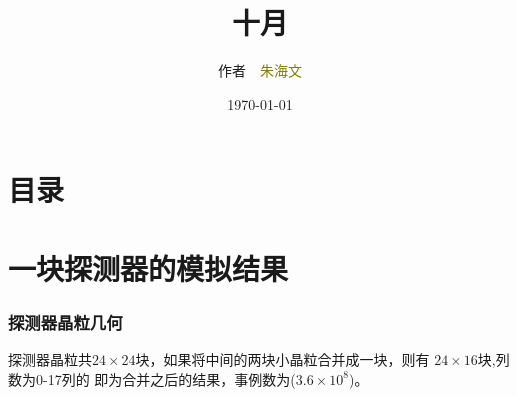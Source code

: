 \documentclass{beamer}
\begin{document}
\begin{CJK*}{UTF8}{gkai}
  \title{十月}
  \author[\textcolor{black}{作者 朱海文}]{作者~~\textcolor{olive}{朱海文}}
  \institute{\textcolor{violet}{摩科特医疗器械有限公司}}
  \date{\today}
  \frame{\titlepage}
  \section*{目录}
  \section{一块探测器的模拟结果}
  \begin{frame}\frametitle{探测器晶粒几何}
    \begin{minipage}[t]{0.3\textwidth}
      \liuhao
      探测器晶粒共$24\times24$块，如果将中间的两块小晶粒合并成一块，则有
      $24\times16$块,列数为0-17列的
      即为合并之后的结果，事例数为($3.6\times10^8$)。
      

\end{minipage}
\end{frame}
\end{CJK*}
\end{document}
